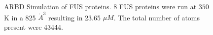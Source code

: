 \documentclass[12ptr]{article}
\begin{document}
\begin{figure}[!ht]
    \centering
    \qquad
    \caption {\small ARBD Simulation of FUS proteins. 8 FUS proteins were run at $350$K in a 825 $\mathring{A}^{3}$ resulting in 23.65 $\mu M$. The total number of atoms present were 43444.}
    \label{fig:fus_350}
\end{figure}
\end{document}
